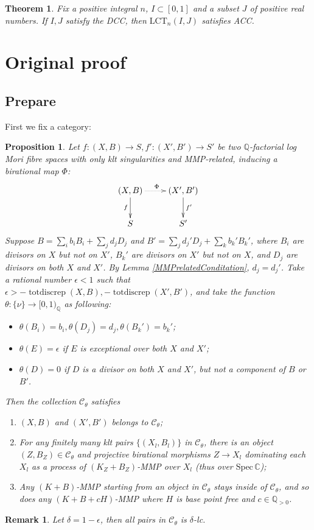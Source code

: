\documentclass{article}
\newtheorem{prop}[defn]{Proposition}
\newtheorem{thm}[defn]{Theorem}
\newtheorem{rmk}[defn]{Remark}
\begin{document}
\begin{thm}
  Fix a positive integral $ n $, $ I\subset [0,1] $ and a subset $ J $ of positive real numbers. If $ I,J $ satisfy the DCC, then $ \mathrm{LCT}_n(I,J) $ satisfies ACC.
\end{thm}
\section{Original proof}
\subsection{Prepare}

First we fix a category: 
\begin{prop}\label{cat}
  \cite[Lemma 3.6]{brunoLogSarkisovProgram1995}
  Let $ f:(X,B)\to S,f':(X',B')\to S' $ be two $ \mathbb{Q} $-factorial log Mori fibre spaces  with only klt singularities and MMP-related, inducing a birational map $\Phi$:
  \[ \xymatrix{
      (X,B)\ar[d]_f\ar@{.>}[r]^\Phi&(X',B')\ar[d]^{f'}\\
 S&S'} \]
 Suppose  $ B=\sum_ib_iB_i+\sum_jd_jD_j $ and $ B'=\sum_jd_j'D_j+\sum_kb_k'B_k' $, where $ B_i $ are divisors on $ X $ but not on $ X' $, $ B_k' $ are divisors on $ X' $ but not on $ X $, and $ D_j $ are divisors on both $ X $ and $ X' $. By Lemma \ref{MMPrelatedConditation}, $ d_j=d_j' $. Take a rational number $ \epsilon<1 $ such that $ \epsilon> -\operatorname{totdiscrep}(X,B),-\operatorname{totdiscrep}(X',B') $, and take the function $ \theta:\{\nu\}\to [0,1)_\mathbb{Q} $ as following:
  \begin{itemize}
    \item $ \theta(B_i)=b_i, \theta(D_j)=d_j,\theta(B_k')=b_k'$;
    \item $ \theta(E)=\epsilon $ if $ E $ is exceptional over both $ X $ and $ X' $;
    \item $ \theta(D)=0 $ if $ D $ is a divisor on both $ X $ and $ X' $, but not a component of $ B $ or $ B' $.
  \end{itemize}
  Then the collection $ \mathcal{C}_\theta $ satisfies
  \begin{enumerate}[1]
    \item $ (X,B) $ and $ (X',B') $ belongs to $ \mathcal{C}_\theta $;
    \item For any finitely many klt pairs $ \{(X_l,B_l)\} $ in $ \mathcal{C}_\theta $, there is an object $ (Z,B_Z)\in \mathcal{C}_\theta $ and projective birational morphisms $ Z\to X_l $ dominating each  $ X_l $ as a process of $ (K_{Z}+B_{Z}) $-MMP over $ X_l $ (thus over $ \mathrm{Spec}\,\mathbb{C} $);
    \item Any $ (K+B) $-MMP starting from an object in $ \mathcal{C}_\theta $ stays inside of $ \mathcal{C}_\theta $, and so does any $ (K+B+cH) $-MMP where $ H $ is base point free and $ c\in \mathbb{Q}_{>0} $. 
  \end{enumerate}
\end{prop}
\begin{rmk}
Let $\delta=1-\epsilon$, then all pairs in $\mathcal{C}_{\theta}$ is $\delta$-lc. 
\end{rmk}
\end{document}
